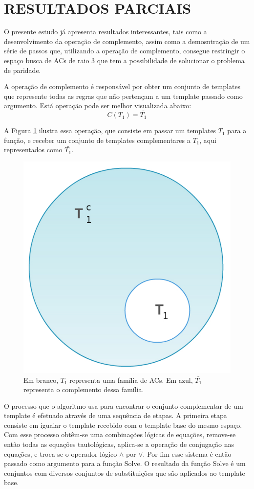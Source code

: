 \documentclass[12pt,a4paper]{article}
\let\stdsection\section
\renewcommand\section{\newpage\stdsection}
\begin{document}
\section{RESULTADOS PARCIAIS}\label{sec:aplicacao}

	O presente estudo já apresenta resultados interessantes, tais como a desenvolvimento da operação de complemento, assim como a demosntração de um série de passos que, utilizando a operação de complemento, consegue restringir o espaço busca de ACs de raio 3 que tem a possibilidade de solucionar o problema de paridade.

	A operação de complemento é responsável por obter um conjunto de templates que represente todas as regras que não pertençam a um template passado como argumento. Está operação pode ser melhor visualizada abaixo:
	\begin{equation}
	C(T_1)=\bar{T_1}
	\end{equation}

	A Figura \ref{fig:complement} ilustra essa operação, que consiste em passar um templates $T_1$ para a função, e receber um conjunto de templates complementares a $T_1$, aqui representados como $\bar{T_1}$.

	\begin{figure}[h!]
	  \centering
	  \includegraphics[width=.3\textwidth]{fig_complement}
	  \caption{Em branco, $T_1$ representa uma família de ACs. Em azul, $\bar{T_1}$ representa o complemento dessa família.}
	  \label{fig:complement}
	\end{figure}

	O processo que o algoritmo usa para encontrar o conjunto complementar de um template é efetuado através de uma sequência de etapas. A primeira etapa consiste em igualar o template recebido com o template base do mesmo espaço. Com esse processo obtêm-se uma combinações lógicas de equações, remove-se então todas as equações tautológicas, aplica-se a operação de conjugação nas equações, e troca-se o operador lógico $\wedge$ por $\vee$. Por fim esse sistema é então passado como argumento para a função Solve. O resultado da função Solve é um conjuntos com diversos conjuntos de substituições que são aplicados ao template base.
\end{document}
